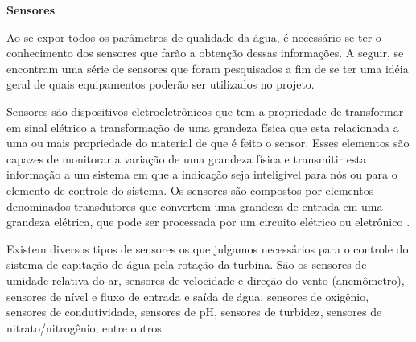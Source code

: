 
\textbf{Sensores}

Ao se expor todos os parâmetros de qualidade da água, é necessário se ter o conhecimento dos sensores que farão a
obtenção dessas informações. A seguir, se encontram uma série de sensores que foram pesquisados a fim de se ter uma 
idéia geral de quais equipamentos poderão ser utilizados no projeto. 

Sensores são dispositivos eletroeletrônicos que tem a propriedade de transformar em sinal elétrico a transformação
de uma grandeza física que esta relacionada a uma ou mais propriedade do material de que é feito o sensor. Esses elementos
são capazes de monitorar a variação de uma grandeza física e transmitir esta informação a um sistema em que a indicação
seja inteligível para nós ou para o elemento de controle do sistema. Os sensores são compostos por elementos denominados
transdutores que convertem uma grandeza de entrada em uma grandeza elétrica, que pode ser processada por um circuito
elétrico ou eletrônico \cite{vinay00}.

Existem diversos tipos de sensores os que julgamos necessários para o controle do sistema de capitação de água pela rotação
da turbina. São os sensores de umidade relativa do ar, sensores de velocidade e direção do vento (anemômetro), sensores
de nível e fluxo de entrada e saída de água, sensores de oxigênio, sensores de condutividade, sensores de pH, sensores
de turbidez, sensores de nitrato/nitrogênio, entre outros.


